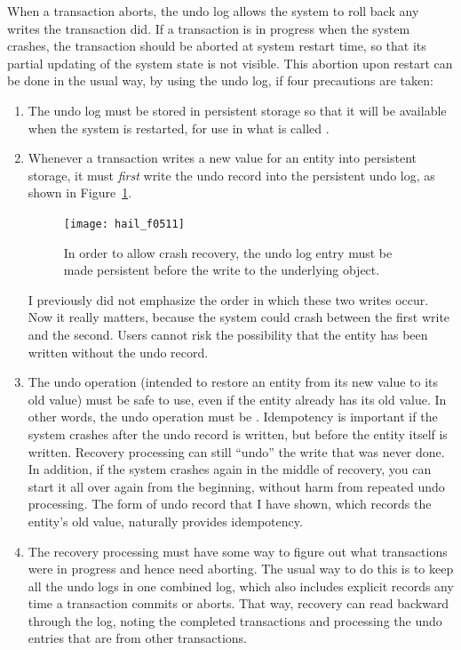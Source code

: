 When a transaction aborts, the undo log allows the system to roll back any
writes the transaction did.  If a transaction is in progress when the
system crashes, the transaction should be aborted at system
restart time, so that its partial updating of the system state is not
visible.  This abortion upon restart can be done in the usual way, by
using the undo log, if four precautions are taken:
\begin{enumerate}
\item
The undo log must be stored in persistent storage so that it will be
available when the system is
restarted, for use in what is called .
\item
Whenever a transaction writes a new value for an entity into
persistent storage, it must \emph{first} write the undo record into
the persistent undo log, as shown in Figure~\ref{scan-5-13}.
\begin{figure}
\centerline{\texttt{[image: hail\_f0511]}}
\caption{In order to allow crash recovery, the undo log entry must be
  made persistent before the write to the underlying object.}
\label{scan-5-13}
\end{figure}
I previously did not emphasize the order
in which these two writes occur.  Now it really matters, because the
system could crash between the first write and the second.  Users cannot
risk the possibility that the entity has been written without the
undo record.
\item
The undo operation (intended to restore an entity from its new value
to its old value) must be safe to use, even if the entity already has
its old value.  In other words, the undo operation must be
.  Idempotency is important if the system
crashes after the undo record is written, but before the entity itself
is written.  Recovery processing can still ``undo'' the write that was
never done.  In addition, if the system crashes again in the middle of
recovery, you can start it all over again from the beginning, without
harm from repeated undo processing.  The form of
undo record that I have shown, which records the entity's old value, naturally
provides idempotency.
\item
The recovery processing must have some way to figure out what
transactions were in progress and hence need aborting.  The usual way
to do this is to keep all the undo logs in one combined log, which
also includes explicit records any time a transaction commits or
aborts.  That way, recovery can read backward through the log, noting
the completed transactions and processing the undo entries that are
from other transactions.
\end{enumerate}

